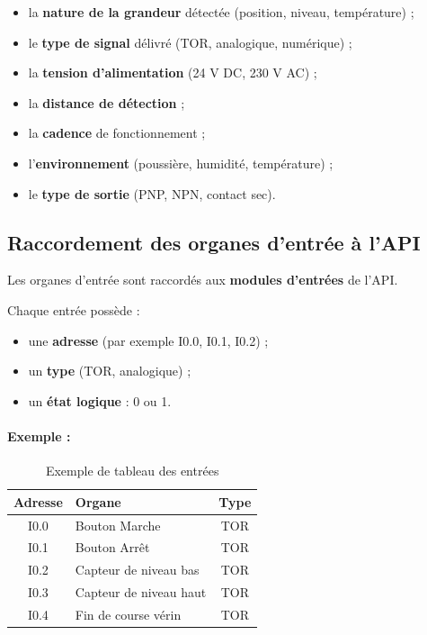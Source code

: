 \begin{itemize}
    \item la \textbf{nature de la grandeur} détectée (position, niveau, température) ;
    \item le \textbf{type de signal} délivré (TOR, analogique, numérique) ;
    \item la \textbf{tension d'alimentation} (24 V DC, 230 V AC) ;
    \item la \textbf{distance de détection} ;
    \item la \textbf{cadence} de fonctionnement ;
    \item l'\textbf{environnement} (poussière, humidité, température) ;
    \item le \textbf{type de sortie} (PNP, NPN, contact sec).
\end{itemize}

\subsection{Raccordement des organes d'entrée à l'API}

Les organes d'entrée sont raccordés aux \textbf{modules d'entrées} de l'API.

Chaque entrée possède :

\begin{itemize}
    \item une \textbf{adresse} (par exemple I0.0, I0.1, I0.2) ;
    \item un \textbf{type} (TOR, analogique) ;
    \item un \textbf{état logique} : 0 ou 1.
\end{itemize}

\paragraph{Exemple :}

\begin{table}[h]
\centering
\begin{tabularx}{\textwidth}{|c|X|c|}
\hline
\textbf{Adresse} & \textbf{Organe} & \textbf{Type} \\
\hline
I0.0 & Bouton Marche & TOR \\
\hline
I0.1 & Bouton Arrêt & TOR \\
\hline
I0.2 & Capteur de niveau bas & TOR \\
\hline
I0.3 & Capteur de niveau haut & TOR \\
\hline
I0.4 & Fin de course vérin & TOR \\
\hline
\end{tabularx}
\caption{Exemple de tableau des entrées}
\end{table}

